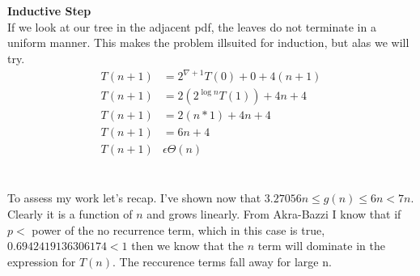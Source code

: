 \documentclass[paper=a4,fontsize=11pt]{article}
\begin{document}
\begin{enumerate}
\begin{enumerate}
\begin{align*}
\end{align*}\\
\textbf{Inductive Step}\\
If we look at our tree in the adjacent pdf, the leaves do not terminate in a uniform manner. This makes the problem illsuited for induction, but alas we will try.\\
\begin{align*}
T(n + 1) &=2^{\nabla + 1}T(0) + 0 + 4(n + 1)\\
T(n + 1) &=2(2^{\log{n}}T(1)) + 4n + 4\\
T(n + 1) &=2(n*1) + 4n + 4\\
T(n + 1) &=6n + 4\\
T(n+1) &\epsilon \Theta(n)\
\end{align*}\\
\\To assess my work let's recap. I've shown now that $3.27056n\leq g(n)\leq 6n<7n$. Clearly it is a function of $n$ and grows linearly. From Akra-Bazzi I know that if $p < $ power of the no recurrence term, which in this case is true, $0.6942419136306174 < 1$ then we know that the $n$ term will dominate in the expression for $T(n)$. The reccurence terms fall away for large n. 
\end{enumerate}
\end{enumerate}
\end{document}
